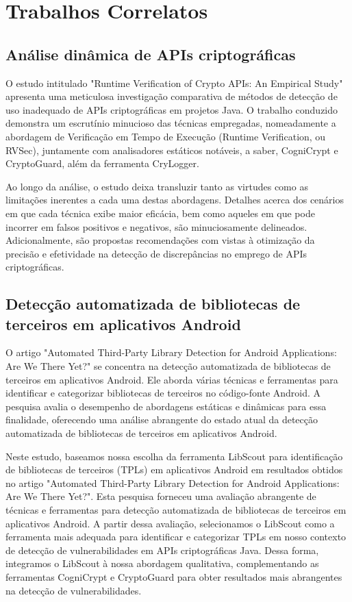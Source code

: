 \section{Trabalhos Correlatos}

\subsection{Análise dinâmica de APIs criptográficas} %
O estudo intitulado "Runtime Verification of Crypto APIs: An Empirical Study" apresenta uma meticulosa investigação comparativa de métodos de detecção de uso inadequado de APIs criptográficas em projetos Java. O trabalho conduzido demonstra um escrutínio minucioso das técnicas empregadas, nomeadamente a abordagem de Verificação em Tempo de Execução (Runtime Verification, ou RVSec), juntamente com analisadores estáticos notáveis, a saber, CogniCrypt e CryptoGuard, além da ferramenta CryLogger.

Ao longo da análise, o estudo deixa transluzir tanto as virtudes como as limitações inerentes a cada uma destas abordagens. Detalhes acerca dos cenários em que cada técnica exibe maior eficácia, bem como aqueles em que pode incorrer em falsos positivos e negativos, são minuciosamente delineados. Adicionalmente, são propostas recomendações com vistas à otimização da precisão e efetividade na detecção de discrepâncias no emprego de APIs criptográficas.

\subsection{Detecção automatizada de bibliotecas de terceiros em aplicativos Android} %
O artigo "Automated Third-Party Library Detection for Android Applications: Are We There Yet?" se concentra na detecção automatizada de bibliotecas de terceiros em aplicativos Android. Ele aborda várias técnicas e ferramentas para identificar e categorizar bibliotecas de terceiros no código-fonte Android. A pesquisa avalia o desempenho de abordagens estáticas e dinâmicas para essa finalidade, oferecendo uma análise abrangente do estado atual da detecção automatizada de bibliotecas de terceiros em aplicativos Android.

Neste estudo, baseamos nossa escolha da ferramenta LibScout para identificação de bibliotecas de terceiros (TPLs) em aplicativos Android em resultados obtidos no artigo "Automated Third-Party Library Detection for Android Applications: Are We There Yet?". Esta pesquisa forneceu uma avaliação abrangente de técnicas e ferramentas para detecção automatizada de bibliotecas de terceiros em aplicativos Android. A partir dessa avaliação, selecionamos o LibScout como a ferramenta mais adequada para identificar e categorizar TPLs em nosso contexto de detecção de vulnerabilidades em APIs criptográficas Java. Dessa forma, integramos o LibScout à nossa abordagem qualitativa, complementando as ferramentas CogniCrypt e CryptoGuard para obter resultados mais abrangentes na detecção de vulnerabilidades.

